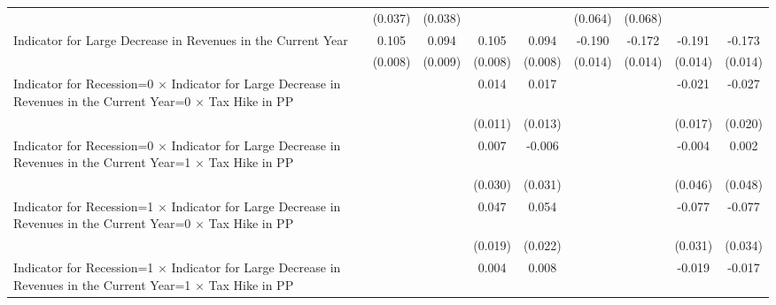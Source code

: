 {\begin{tabular}{l*{8}{c}}
                    &     (0.037)         &     (0.038)         &                     &                     &     (0.064)         &     (0.068)         &                     &                     \\
Indicator for Large Decrease in Revenues in the Current Year&       0.105\sym{***}&       0.094\sym{***}&       0.105\sym{***}&       0.094\sym{***}&      -0.190\sym{***}&      -0.172\sym{***}&      -0.191\sym{***}&      -0.173\sym{***}\\
                    &     (0.008)         &     (0.009)         &     (0.008)         &     (0.008)         &     (0.014)         &     (0.014)         &     (0.014)         &     (0.014)         \\
Indicator for Recession=0 $\times$ Indicator for Large Decrease in Revenues in the Current Year=0 $\times$ Tax Hike in PP&                     &                     &       0.014         &       0.017         &                     &                     &      -0.021         &      -0.027         \\
                    &                     &                     &     (0.011)         &     (0.013)         &                     &                     &     (0.017)         &     (0.020)         \\
Indicator for Recession=0 $\times$ Indicator for Large Decrease in Revenues in the Current Year=1 $\times$ Tax Hike in PP&                     &                     &       0.007         &      -0.006         &                     &                     &      -0.004         &       0.002         \\
                    &                     &                     &     (0.030)         &     (0.031)         &                     &                     &     (0.046)         &     (0.048)         \\
Indicator for Recession=1 $\times$ Indicator for Large Decrease in Revenues in the Current Year=0 $\times$ Tax Hike in PP&                     &                     &       0.047\sym{**} &       0.054\sym{**} &                     &                     &      -0.077\sym{**} &      -0.077\sym{**} \\
                    &                     &                     &     (0.019)         &     (0.022)         &                     &                     &     (0.031)         &     (0.034)         \\
Indicator for Recession=1 $\times$ Indicator for Large Decrease in Revenues in the Current Year=1 $\times$ Tax Hike in PP&                     &                     &       0.004         &       0.008         &                     &                     &      -0.019         &      -0.017         \\

\end{tabular}}
